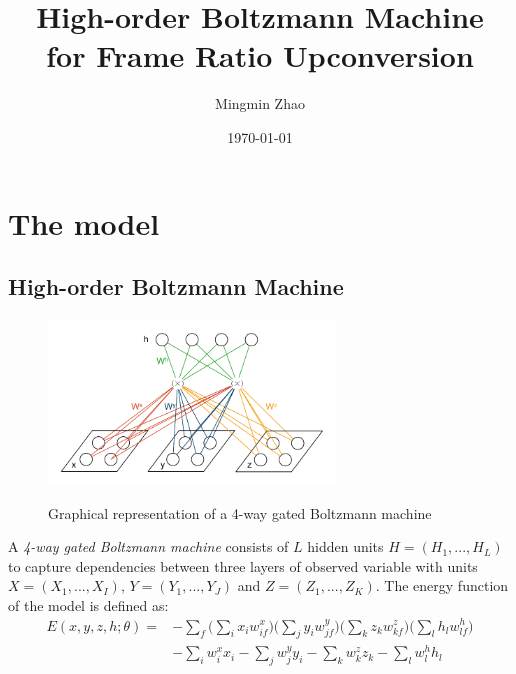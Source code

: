 \documentclass{article}
\begin{document}
\title{\textbf{High-order Boltzmann Machine \\for Frame Ratio Upconversion}}
\author{Mingmin Zhao}

\date{\today}
\maketitle


\section{The model}

\subsection{High-order Boltzmann Machine}

\begin{figure}
  \centering
  \includegraphics[width=3in]{4GRBM}\\
  \caption{Graphical representation of a 4-way gated Boltzmann machine}\label{4GRBM}
\end{figure}

A \textit{4-way gated Boltzmann machine} consists of $L$ hidden units $H = (H_1, ..., H_L)$ to capture dependencies between three layers of observed variable with units $X = (X_1, ..., X_I)$, $Y = (Y_1, ..., Y_J)$ and $Z = (Z_1, ..., Z_K)$. 
The energy function of the model is defined as:
\begin{equation}
\begin{split}
E(x,y,z,h;\theta) = &-\sum_f{\bigg(\sum_i{x_i w_{if}^x}\bigg) \bigg(\sum_j{y_i w_{jf}^y}\bigg) \bigg(\sum_k{z_k w_{kf}^z}\bigg) \bigg(\sum_l{h_l w_{lf}^h}\bigg)} 
\\
&- \sum_i{w_{i}^x x_i} - \sum_j{w_{j}^y y_i} - \sum_k{w_{k}^z z_k} - \sum_l{w_{l}^h h_l}
\end{split}
\end{equation}
\end{document}

